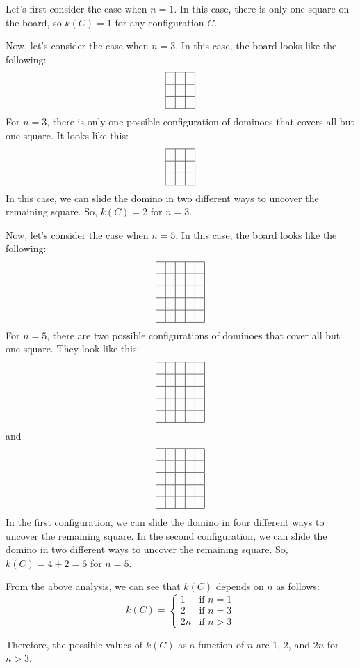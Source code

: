 Let's first consider the case when $n=1$. In this case, there is only one square on the board, so $k(C)=1$ for any configuration $C$.

Now, let's consider the case when $n=3$. In this case, the board looks like the following:
\[
\begin{array}{|c|c|c|}
\hline
& & \\
\hline
& & \\
\hline
& & \\
\hline
\end{array}
\]
For $n=3$, there is only one possible configuration of dominoes that covers all but one square. It looks like this:
\[
\begin{array}{|c|c|c|}
\hline
& & \\
\hline
& & \\
\hline
& & \\
\hline
\end{array}
\]
In this case, we can slide the domino in two different ways to uncover the remaining square. So, $k(C)=2$ for $n=3$.

Now, let's consider the case when $n=5$. In this case, the board looks like the following:
\[
\begin{array}{|c|c|c|c|c|}
\hline
& & & & \\
\hline
& & & & \\
\hline
& & & & \\
\hline
& & & & \\
\hline
& & & & \\
\hline
\end{array}
\]
For $n=5$, there are two possible configurations of dominoes that cover all but one square. They look like this:
\[
\begin{array}{|c|c|c|c|c|}
\hline
& & & & \\
\hline
& & & & \\
\hline
& & & & \\
\hline
& & & & \\
\hline
& & & & \\
\hline
\end{array}
\]
and
\[
\begin{array}{|c|c|c|c|c|}
\hline
& & & & \\
\hline
& & & & \\
\hline
& & & & \\
\hline
& & & & \\
\hline
& & & & \\
\hline
\end{array}
\]
In the first configuration, we can slide the domino in four different ways to uncover the remaining square. In the second configuration, we can slide the domino in two different ways to uncover the remaining square. So, $k(C)=4+2=6$ for $n=5$.

From the above analysis, we can see that $k(C)$ depends on $n$ as follows:
\[k(C) = 
\begin{cases} 
1 & \text{if } n=1 \\
2 & \text{if } n=3 \\
2n & \text{if } n>3
\end{cases}
\]

Therefore, the possible values of $k(C)$ as a function of $n$ are $1$, $2$, and $2n$ for $n>3$.
